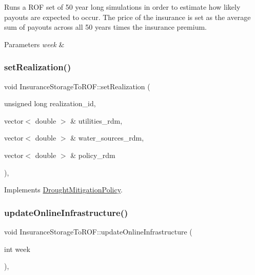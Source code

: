Runs a R\+OF set of 50 year long simulations in order to estimate how likely payouts are expected to occur. The price of the insurance is set as the average sum of payouts across all 50 years times the insurance premium. 
\begin{DoxyParams}{Parameters}
{\em week} & \\
\hline
\end{DoxyParams}
\mbox{\label{classInsuranceStorageToROF_a6318c3dca8b0c4d568eac494e5ccf712_a6318c3dca8b0c4d568eac494e5ccf712}} 
\subsubsection{\texorpdfstring{set\+Realization()}{setRealization()}}
{\footnotesize\ttfamily void Insurance\+Storage\+To\+R\+O\+F\+::set\+Realization (\begin{DoxyParamCaption}\item[{unsigned long}]{realization\+\_\+id,  }\item[{vector$<$ double $>$ \&}]{utilities\+\_\+rdm,  }\item[{vector$<$ double $>$ \&}]{water\+\_\+sources\+\_\+rdm,  }\item[{vector$<$ double $>$ \&}]{policy\+\_\+rdm }\end{DoxyParamCaption})\hspace{0.3cm}{\ttfamily [override]}, {\ttfamily [virtual]}}



Implements \mbox{\hyperlink{classDroughtMitigationPolicy_a5d2033543cacca1e412eebef5106eab4_a5d2033543cacca1e412eebef5106eab4}{Drought\+Mitigation\+Policy}}.

\mbox{\label{classInsuranceStorageToROF_a5870934b8b33e1d872eca7b0940398ac_a5870934b8b33e1d872eca7b0940398ac}} 
\subsubsection{\texorpdfstring{update\+Online\+Infrastructure()}{updateOnlineInfrastructure()}}
{\footnotesize\ttfamily void Insurance\+Storage\+To\+R\+O\+F\+::update\+Online\+Infrastructure (\begin{DoxyParamCaption}\item[{int}]{week }\end{DoxyParamCaption})\hspace{0.3cm}{\ttfamily [override]}, {\ttfamily [virtual]}}

